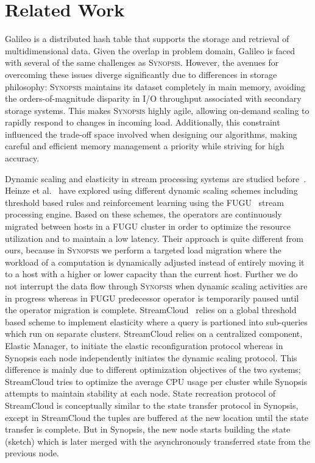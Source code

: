 \section{Related Work}
\label{sec:related}

Galileo \cite{} is a distributed hash table that supports the storage and retrieval of multidimensional data. Given the overlap in problem domain, Galileo is faced with several of the same challenges as \textsc{Synopsis}. However, the avenues for overcoming these issues diverge significantly due to differences in storage philosophy: \textsc{Synopsis} maintains its dataset completely in main memory, avoiding the orders-of-magnitude disparity in I/O throughput associated with secondary storage systems. This makes \textsc{Synopsis} highly agile, allowing on-demand scaling to rapidly respond to changes in incoming load. Additionally, this constraint influenced the trade-off space involved when designing our algorithms, making careful and efficient memory management a priority while striving for high accuracy.

Dynamic scaling and elasticity in stream processing systems are studied before~\cite{heinze2014auto, gulisano2012streamcloud, castro2013integrating, loesing2012stormy, heinze2013elastic}.
Heinze et al.~\cite{heinze2014auto} have explored using different dynamic scaling schemes including threshold based rules and reinforcement learning using the FUGU~\cite{heinze2013elastic} stream processing engine.
Based on these schemes, the operators are continuously migrated between hosts in a FUGU cluster in order to optimize the resource utilization and to maintain a low latency.
Their approach is quite different from ours, because in \textsc{Synopsis} we perform a targeted load migration where the workload of a computation is dynamically adjusted instead of entirely moving it to a host with a higher or lower capacity than the current host.
Further we do not interrupt the data flow through \textsc{Synopsis} when dynamic scaling activities are in progress whereas in FUGU predecessor operator is temporarily paused until the operator migration is complete. 
StreamCloud~\cite{gulisano2012streamcloud} relies on a global threshold based scheme to implement elasticity where a query is partioned into sub-queries which run on separate clusters.
StreamCloud relies on a centralized component, Elastic Manager, to initiate the elastic reconfiguration protocol whereas in Synopsis each node independently initiates the dynamic scaling protocol.
This difference is mainly due to different optimization objectives of the two systems; StreamCloud tries to optimize the average CPU usage per cluster while Synopsis attempts to maintain stability at each node.
State recreation protocol of StreamCloud is conceptually similar to the state transfer protocol in Synopsis, except in StreamCloud the tuples are buffered at the new location until the state transfer is complete.
But in Synopsis, the new node starts building the state (sketch) which is later merged with the asynchronously transferred state from the previous node.

